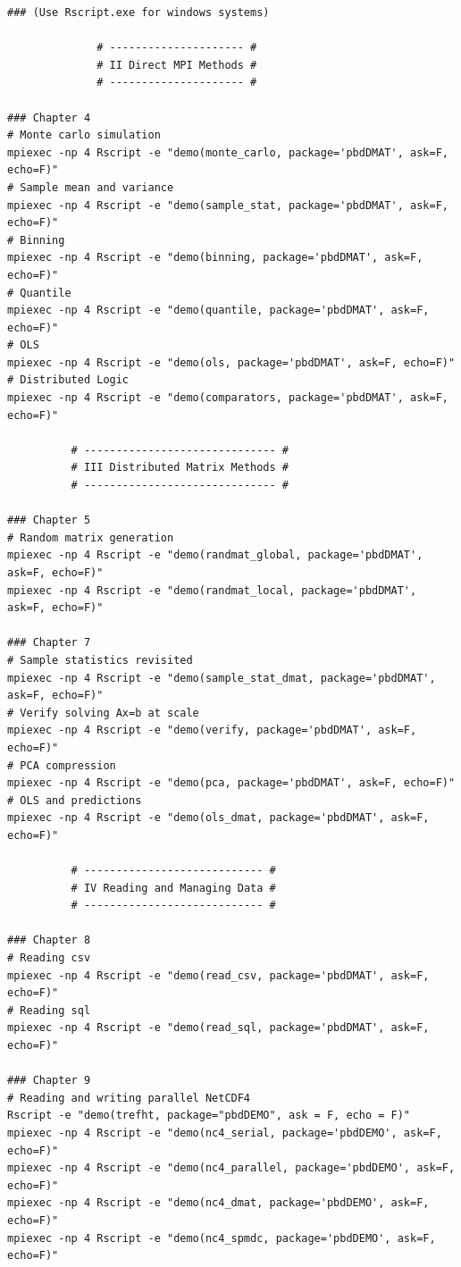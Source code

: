 \begin{lstlisting}[title=List of Demos]
### (Use Rscript.exe for windows systems)

		      # --------------------- #
		      # II Direct MPI Methods #
		      # --------------------- #

### Chapter 4
# Monte carlo simulation
mpiexec -np 4 Rscript -e "demo(monte_carlo, package='pbdDMAT', ask=F, echo=F)"
# Sample mean and variance
mpiexec -np 4 Rscript -e "demo(sample_stat, package='pbdDMAT', ask=F, echo=F)"
# Binning
mpiexec -np 4 Rscript -e "demo(binning, package='pbdDMAT', ask=F, echo=F)"
# Quantile
mpiexec -np 4 Rscript -e "demo(quantile, package='pbdDMAT', ask=F, echo=F)"
# OLS
mpiexec -np 4 Rscript -e "demo(ols, package='pbdDMAT', ask=F, echo=F)"
# Distributed Logic
mpiexec -np 4 Rscript -e "demo(comparators, package='pbdDMAT', ask=F, echo=F)"

		  # ------------------------------ #
		  # III Distributed Matrix Methods #
		  # ------------------------------ #

### Chapter 5
# Random matrix generation
mpiexec -np 4 Rscript -e "demo(randmat_global, package='pbdDMAT', ask=F, echo=F)"
mpiexec -np 4 Rscript -e "demo(randmat_local, package='pbdDMAT', ask=F, echo=F)"

### Chapter 7
# Sample statistics revisited
mpiexec -np 4 Rscript -e "demo(sample_stat_dmat, package='pbdDMAT', ask=F, echo=F)"
# Verify solving Ax=b at scale
mpiexec -np 4 Rscript -e "demo(verify, package='pbdDMAT', ask=F, echo=F)"
# PCA compression
mpiexec -np 4 Rscript -e "demo(pca, package='pbdDMAT', ask=F, echo=F)"
# OLS and predictions
mpiexec -np 4 Rscript -e "demo(ols_dmat, package='pbdDMAT', ask=F, echo=F)"

		  # ---------------------------- #
		  # IV Reading and Managing Data #
		  # ---------------------------- #

### Chapter 8
# Reading csv
mpiexec -np 4 Rscript -e "demo(read_csv, package='pbdDMAT', ask=F, echo=F)"
# Reading sql
mpiexec -np 4 Rscript -e "demo(read_sql, package='pbdDMAT', ask=F, echo=F)"

### Chapter 9
# Reading and writing parallel NetCDF4
Rscript -e "demo(trefht, package="pbdDEMO", ask = F, echo = F)"
mpiexec -np 4 Rscript -e "demo(nc4_serial, package='pbdDEMO', ask=F, echo=F)"
mpiexec -np 4 Rscript -e "demo(nc4_parallel, package='pbdDEMO', ask=F, echo=F)"
mpiexec -np 4 Rscript -e "demo(nc4_dmat, package='pbdDEMO', ask=F, echo=F)"
mpiexec -np 4 Rscript -e "demo(nc4_spmdc, package='pbdDEMO', ask=F, echo=F)"


\end{lstlisting}

